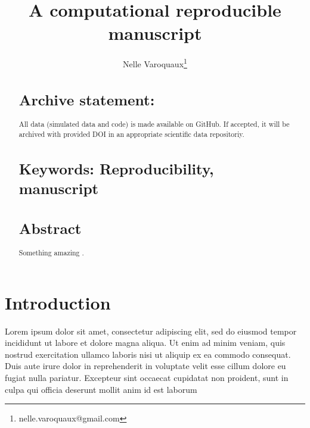 \documentclass[9pt,a4paper,]{extarticle}
\begin{document}
\pagestyle{front}

\title{A computational reproducible manuscript}

\author[1]{Nelle Varoquaux\thanks{\ttfamily nelle.varoquaux@gmail.com}}

\maketitle
\thispagestyle{front}

\begin{abstract}
\hypertarget{archive-statement}{%
\section{Archive statement:}\label{archive-statement}}

All data (simulated data and code) is made available on GitHub. If accepted, it will be archived with provided DOI in an appropriate scientific data repositoriy.

\hypertarget{keywords-reproducibility-manuscript}{%
\section{Keywords: Reproducibility, manuscript}\label{keywords-reproducibility-manuscript}}

\hypertarget{abstract}{%
\section{Abstract}\label{abstract}}

Something amazing \citep{noble:quick}.\\
\newpage
\end{abstract}


\clearpage
\pagestyle{main}

\hypertarget{introduction}{%
\section{Introduction}\label{introduction}}

Lorem ipsum dolor sit amet, consectetur adipiscing elit, sed do eiusmod tempor
incididunt ut labore et dolore magna aliqua. Ut enim ad minim veniam, quis
nostrud exercitation ullamco laboris nisi ut aliquip ex ea commodo consequat.
Duis aute irure dolor in reprehenderit in voluptate velit esse cillum dolore
eu fugiat nulla pariatur. Excepteur sint occaecat cupidatat non proident, sunt
in culpa qui officia deserunt mollit anim id est laborum
\end{document}
